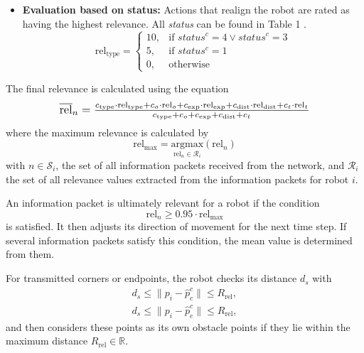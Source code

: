 \documentclass[conference]{IEEEtran}
\begin{document}
\begin{itemize}
    \item \textbf{Evaluation based on status:}
    Actions that realign the robot are rated as having the highest relevance. All \textit{status} can be found in Table 1
    .
    \begin{equation}
        \mathrm{rel}_{\mathrm{type}} =
        \begin{cases}
        10, & \text{if } status^c = 4 \vee status^c = 3 \\
        5,  & \text{if } status^c = 1 \\
        0,  & \text{otherwise}
        \end{cases}
        \label{eq:10}
    \end{equation}
\end{itemize}

The final relevance is calculated using the equation
\begin{equation}
    \scalebox{1.15}{$\overline{\mathrm{rel}}_n = \frac{c_{\mathrm{type}} \cdot \mathrm{rel}_{\mathrm{type}} + c_o \cdot \mathrm{rel}_o + c_{\mathrm{exp}} \cdot \mathrm{rel}_{\mathrm{exp}} + c_{\mathrm{dist}} \cdot \mathrm{rel}_{\mathrm{dist}} + c_t \cdot \mathrm{rel}_t}{c_{\mathrm{type}} + c_o + c_{\mathrm{exp}} + c_{\mathrm{dist}} + c_t}$}
    \label{eq:11}
\end{equation}
where the maximum relevance is calculated by 
\begin{equation}
    \mathrm{rel}_{\mathrm{max}} = \underset{\mathrm{rel}_n \in \mathcal{R}_i}{\mathrm{argmax}}(\mathrm{rel}_n)
    \label{eq:12}
\end{equation}
with $n \in \mathcal{S}_i$, the set of all information packets received from the network, and 
$\mathcal{R}_i$ the set of all relevance values extracted from the information packets for robot $i$.

An information packet is ultimately relevant for a robot if the condition
\begin{equation}
    \mathrm{rel}_n \geq 0.95 \cdot \mathrm{rel}_{\mathrm{max}}
    \label{eq:13}
\end{equation}
is satisfied. It then adjusts its 
direction of movement for the next time step. If several information packets 
satisfy this condition, the mean value is determined from them.

For transmitted corners or endpoints, the robot checks its distance $d_s$ with
\begin{equation}
    \begin{split}
    d_s \leq \| p_i - \hat{p}_c^c \| \leq R_{\mathrm{rel}},\\
    d_s \leq \| p_i - \hat{p}_e^c \| \leq R_{\mathrm{rel}},
    \end{split}
    \label{eq:14}
\end{equation}
and then considers these points as its own obstacle points if 
they lie within the maximum distance \( R_{\mathrm{rel}} \in \mathbb{R} \).
\end{document}
